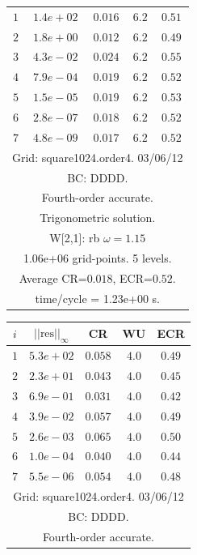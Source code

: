 \begin{table}[hbt]
\begin{center}
{\begin{tabular}{|c|c|c|c|c|}
 $ 1$  & $ 1.4e+02$ & $0.016$ & $ 6.2$ & $0.51$ \\ 
 $ 2$  & $ 1.8e+00$ & $0.012$ & $ 6.2$ & $0.49$ \\ 
 $ 3$  & $ 4.3e-02$ & $0.024$ & $ 6.2$ & $0.55$ \\ 
 $ 4$  & $ 7.9e-04$ & $0.019$ & $ 6.2$ & $0.52$ \\ 
 $ 5$  & $ 1.5e-05$ & $0.019$ & $ 6.2$ & $0.53$ \\ 
 $ 6$  & $ 2.8e-07$ & $0.018$ & $ 6.2$ & $0.52$ \\ 
 $ 7$  & $ 4.8e-09$ & $0.017$ & $ 6.2$ & $0.52$ \\ 
\hline 
\multicolumn{5}{|c|}{Grid: square1024.order4. 03/06/12}  \\
\multicolumn{5}{|c|}{BC: DDDD.}  \\
\multicolumn{5}{|c|}{Fourth-order accurate.}  \\
\multicolumn{5}{|c|}{Trigonometric solution.}  \\
\multicolumn{5}{|c|}{W[2,1]: rb $\omega=1.15$}  \\
\multicolumn{5}{|c|}{1.06e+06 grid-points. 5 levels.}  \\
\multicolumn{5}{|c|}{Average CR=$0.018$, ECR=$0.52$.}  \\
\multicolumn{5}{|c|}{time/cycle = 1.23e+00 s.}  \\
\hline 
\end{tabular}
\begin{tabular}{|c|c|c|c|c|} \hline 
 $i$   & $\vert\vert\mbox{res}\vert\vert_\infty$  &  CR     &  WU    & ECR  \\   \hline 
 $ 1$  & $ 5.3e+02$ & $0.058$ & $ 4.0$ & $0.49$ \\ 
 $ 2$  & $ 2.3e+01$ & $0.043$ & $ 4.0$ & $0.45$ \\ 
 $ 3$  & $ 6.9e-01$ & $0.031$ & $ 4.0$ & $0.42$ \\ 
 $ 4$  & $ 3.9e-02$ & $0.057$ & $ 4.0$ & $0.49$ \\ 
 $ 5$  & $ 2.6e-03$ & $0.065$ & $ 4.0$ & $0.50$ \\ 
 $ 6$  & $ 1.0e-04$ & $0.040$ & $ 4.0$ & $0.44$ \\ 
 $ 7$  & $ 5.5e-06$ & $0.054$ & $ 4.0$ & $0.48$ \\ 
\hline 
\multicolumn{5}{|c|}{Grid: square1024.order4. 03/06/12}  \\
\multicolumn{5}{|c|}{BC: DDDD.}  \\
\multicolumn{5}{|c|}{Fourth-order accurate.}  \\

\end{tabular}}
\end{center}
\end{table}
